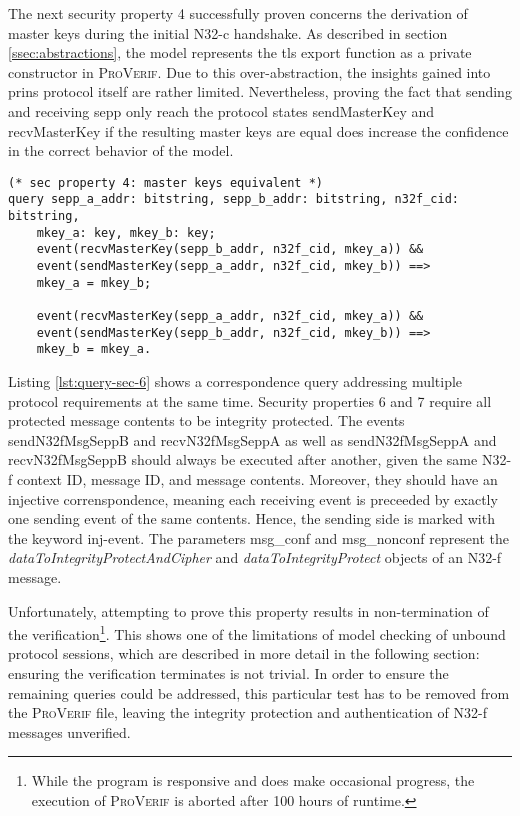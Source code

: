 The next security property 4 successfully proven concerns the derivation of master keys during the initial N32-c handshake.
As described in section \ref{ssec:abstractions}, the model represents the \gls{tls} export function as a private constructor in \textsc{ProVerif}.
Due to this over-abstraction, the insights gained into \gls{prins} protocol itself are rather limited.
Nevertheless, proving the fact that sending and receiving \gls{sepp} only reach the protocol states {\sffamily sendMasterKey} and {\sffamily recvMasterKey} if the resulting master keys are equal does increase the confidence in the correct behavior of the model.

\begin{lstlisting}[caption={Query for security property 4},label={lst:query-sec-4},firstnumber=221]
(* sec property 4: master keys equivalent *)
query sepp_a_addr: bitstring, sepp_b_addr: bitstring, n32f_cid: bitstring,
    mkey_a: key, mkey_b: key;
    event(recvMasterKey(sepp_b_addr, n32f_cid, mkey_a)) &&
    event(sendMasterKey(sepp_a_addr, n32f_cid, mkey_b)) ==>
    mkey_a = mkey_b;

    event(recvMasterKey(sepp_a_addr, n32f_cid, mkey_a)) &&
    event(sendMasterKey(sepp_b_addr, n32f_cid, mkey_b)) ==>
    mkey_b = mkey_a.
\end{lstlisting}

Listing \ref{lst:query-sec-6} shows a correspondence query addressing multiple protocol requirements at the same time.
Security properties 6 and 7 require all protected message contents to be integrity protected.
The events {\sffamily sendN32fMsgSeppB} and {\sffamily recvN32fMsgSeppA} as well as {\sffamily sendN32fMsgSeppA} and {\sffamily recvN32fMsgSeppB} should always be executed after another, given the same N32-f context ID, message ID, and message contents.
Moreover, they should have an injective correnspondence, meaning each receiving event is preceeded by exactly one sending event of the same contents.
Hence, the sending side is marked with the keyword {\sffamily inj-event}.
The parameters {\sffamily msg\_conf} and {\sffamily msg\_nonconf} represent the \textit{dataToIntegrityProtectAndCipher} and \textit{dataToIntegrityProtect} objects of an N32-f message.

Unfortunately, attempting to prove this property results in non-termination of the verification\footnote{While the program is responsive and does make occasional progress, the execution of \textsc{ProVerif} is aborted after 100 hours of runtime.}.
This shows one of the limitations of model checking of unbound protocol sessions, which are described in more detail in the following section: ensuring the verification terminates is not trivial.
In order to ensure the remaining queries could be addressed, this particular test has to be removed from the \textsc{ProVerif} file, leaving the integrity protection and authentication of N32-f messages unverified.

